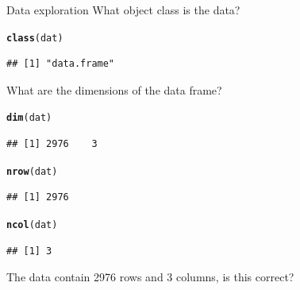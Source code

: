 \documentclass[xcolor=svgnames]{beamer}\usepackage[]{graphicx}\usepackage[]{color}
\makeatletter
\newcommand{\hlstd}[1]{\textcolor[rgb]{0.345,0.345,0.345}{#1}}%
\newcommand{\hlkwd}[1]{\textcolor[rgb]{0.737,0.353,0.396}{\textbf{#1}}}%
\newenvironment{kframe}{%
 \def\at@end@of@kframe{}%
 \ifinner\ifhmode%
  \def\at@end@of@kframe{\end{minipage}}%
  \begin{minipage}{\columnwidth}%
 \fi\fi%
 \def\FrameCommand##1{\hskip\@totalleftmargin \hskip-\fboxsep
 \colorbox{shadecolor}{##1}\hskip-\fboxsep
     \hskip-\linewidth \hskip-\@totalleftmargin \hskip\columnwidth}%
 \MakeFramed {\advance\hsize-\width
   \@totalleftmargin\z@ \linewidth\hsize
   \@setminipage}}%
 {\par\unskip\endMakeFramed%
 \at@end@of@kframe}
\newenvironment{knitrout}{}{} %
\makeatother
\begin{document}
\begin{frame}[fragile]{Data exploration}
What object class is the data?
\begin{knitrout}\scriptsize
{}\color{fgcolor}\begin{kframe}
\begin{alltt}
\hlkwd{class}\hlstd{(dat)}
\end{alltt}
\begin{verbatim}
## [1] "data.frame"
\end{verbatim}
\end{kframe}
\end{knitrout}
What are the dimensions of the data frame?
\begin{knitrout}\scriptsize
{}\color{fgcolor}\begin{kframe}
\begin{alltt}
\hlkwd{dim}\hlstd{(dat)}
\end{alltt}
\begin{verbatim}
## [1] 2976    3
\end{verbatim}
\begin{alltt}
\hlkwd{nrow}\hlstd{(dat)}
\end{alltt}
\begin{verbatim}
## [1] 2976
\end{verbatim}
\begin{alltt}
\hlkwd{ncol}\hlstd{(dat)}
\end{alltt}
\begin{verbatim}
## [1] 3
\end{verbatim}
\end{kframe}
\end{knitrout}
The data contain 2976 rows and 3 columns, is this correct?
\end{frame}
\end{document}
